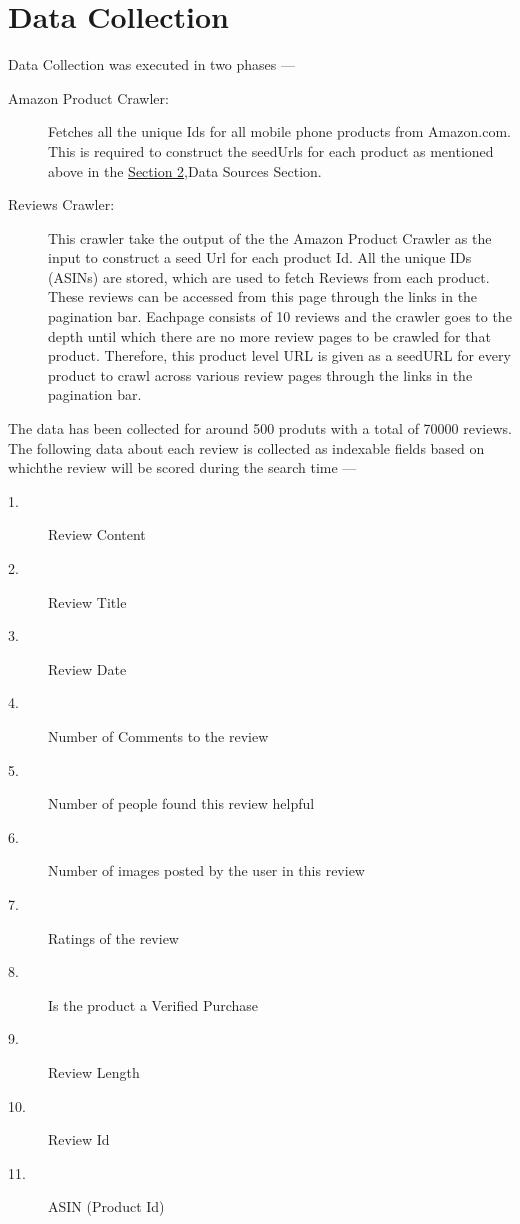 \documentclass{article}
\begin{document}
\section{Data Collection}

Data Collection was executed in two phases ---

\begin{description}
	\item[Amazon Product Crawler: ] Fetches all the unique Ids for all mobile phone products from Amazon.com. This is required to construct the seedUrls for each product as mentioned above in the \hyperref[sec:dataSources]{Section 2},Data Sources Section.
	\item[Reviews Crawler: ] This crawler take the output of the the Amazon Product Crawler as the input to construct a seed Url for each product Id. All the unique IDs (ASINs) are stored, which are used to fetch Reviews from each product. These reviews can be accessed from this page through the links in the pagination bar. Eachpage consists of 10 reviews and the crawler goes to the depth until which there are no more review pages to be crawled for that product. Therefore, this product level URL is given as a seedURL for every product to crawl across various review pages through the links in the pagination bar.
\end{description}

The data has been collected for around 500 produts with a total of 70000 reviews. The following data about each review is collected as indexable fields based on whichthe review will be scored during the search time ---

\begin{description}
	\item[1. ] Review Content
	\item[2. ] Review Title
	\item[3. ] Review Date
	\item[4. ] Number of Comments to the review
	\item[5. ] Number of people found this review helpful
	\item[6. ] Number of images posted by the user in this review
	\item[7. ] Ratings of the review 
	\item[8. ] Is the product a Verified Purchase
	\item[9. ] Review Length
	\item[10. ] Review Id
	\item[11. ] ASIN (Product Id)
\end{description}
\end{document}
